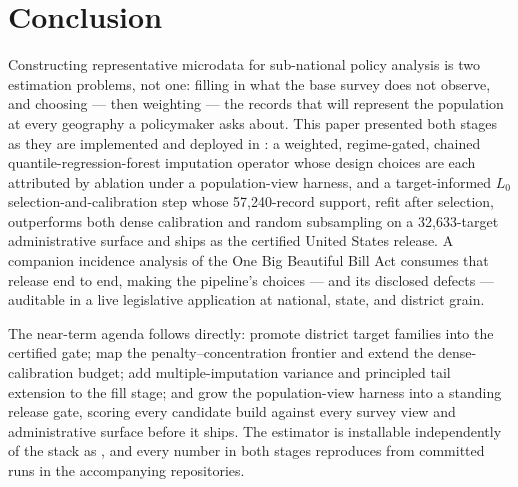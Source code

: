 \section{Conclusion}
\label{sec:conclusion}

Constructing representative microdata for sub-national policy
analysis is two estimation problems, not one: filling in what the
base survey does not observe, and choosing --- then weighting --- the
records that will represent the population at every geography a
policymaker asks about. This paper presented both stages as they are
implemented and deployed in \populace{}: a weighted, regime-gated,
chained quantile-regression-forest imputation operator whose design
choices are each attributed by ablation under a population-view
harness, and a target-informed $L_0$ selection-and-calibration step
whose 57{,}240-record support, refit after selection, outperforms
both dense calibration and random subsampling on a 32{,}633-target
administrative surface and ships as the certified United States
release. A companion incidence analysis of the One Big Beautiful
Bill Act consumes that release end to end, making the pipeline's
choices --- and its disclosed defects --- auditable in a live
legislative application at national, state, and district grain.

The near-term agenda follows directly: promote district target
families into the certified gate; map the penalty--concentration
frontier and extend the dense-calibration budget; add
multiple-imputation variance and principled tail extension to the
fill stage; and grow the population-view harness into a standing
release gate, scoring every candidate build against every survey
view and administrative surface before it ships. The estimator is
installable independently of the stack as \populacefit{}, and every
number in both stages reproduces from committed runs in the
accompanying repositories.
